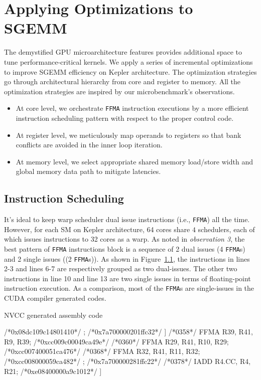 \documentclass{sig-alternate-05-2015}
\begin{document}
\section{Applying Optimizations to SGEMM }
\label{sec:optimization}
The demystified GPU microarchitecture features provides additional space to tune performance-critical kernels. We apply a series of incremental optimizations to improve SGEMM efficiency on Kepler architecture. The optimization strategies go through architectural hierarchy from core and register to memory. All the optimization strategies are inspired by our microbenchmark's observations.
\begin{itemize}
\item At core level, we orchestrate {\tt FFMA} instruction executions by a more efficient instruction scheduling pattern with respect to the proper control code.
\item At register level, we meticulously map operands to registers so that  bank conflicts are avoided in the inner loop iteration.
\item At memory level, we select appropriate shared memory load/store width and global memory data path to mitigate latencies.
\end{itemize}

\subsection{Instruction Scheduling}
It's ideal to keep warp scheduler dual issue instructions (i.e., {\tt FFMA}) all the time. However, for each SM on Kepler architecture, 64 cores share $4$ schedulers, each of which issues instructions to 32 cores as a warp. As noted in {\em observation 3}, the best pattern of {\tt FFMA} instructions block is a sequence of 2 dual issues (4 {\tt FFMA}s) and 2 single issues ((2 {\tt FFMA}s)). As shown in Figure~\ref{}, the instructions in lines 2-3 and lines 6-7 are respectively grouped as two dual-issues. The other two instructions in line 10 and line 13 are two single issues in terms of floating-point instruction execution. As a comparison, most of the {\tt FFMA}s are single-issues in the CUDA compiler generated codes.


\begin{algorithm}
      \caption{NVCC generated assembly code}\label{nvcc}
  \begin{algorithmic}[1]
      \footnotesize
        \State /*0x08dc109c14801410*/
        \State [
        \State /*0348*/ FFMA R28, R41, R15, R28; /*0xcc007000079ca472*/
        \State /*0350*/ LDS.128 R12, [0x40];     /*0x7a700000201ffc32*/
        \State ]
        \State /*0358*/ FFMA R39, R41, R9, R39; /*0xcc009c00049ca49e*/
        \State /*0360*/ FFMA R29, R41, R10, R29; /*0xcc007400051ca476*/
        \State /*0368*/ FFMA R32, R41, R11, R32; /*0xcc008000059ca482*/
        \State [
        \State /*0370*/ LDS.128 R8, [0x50]; /*0x7a700000281ffc22*/
        \State /*0378*/ IADD R4.CC, R4, R21; /*0xe08400000a9c1012*/
    \State ]
  \end{algorithmic}
\end{algorithm}
\end{document}
